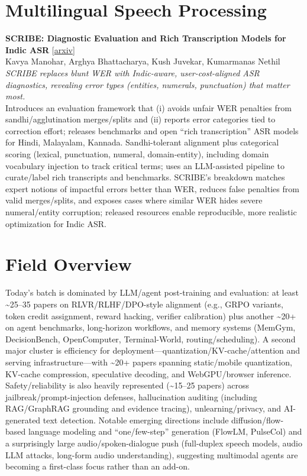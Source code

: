 \documentclass[12pt,letterpaper]{article}
\begin{document}
\medskip


\section*{Multilingual Speech Processing}

{\small\textbf{SCRIBE: Diagnostic Evaluation and Rich Transcription Models for Indic ASR}} {\scriptsize[\href{https://arxiv.org/abs/2605.20712}{arxiv}]}\\
{\scriptsize Kavya Manohar, Arghya Bhattacharya, Kush Juvekar, Kumarmanas Nethil}\\

{\small\textit{SCRIBE replaces blunt WER with Indic-aware, user-cost-aligned ASR diagnostics, revealing error types (entities, numerals, punctuation) that matter most.}}\\[1pt]
{\footnotesize Introduces an evaluation framework that (i) avoids unfair WER penalties from sandhi/agglutination merges/splits and (ii) reports error categories tied to correction effort; releases benchmarks and open ``rich transcription'' ASR models for Hindi, Malayalam, Kannada. Sandhi-tolerant alignment plus categorical scoring (lexical, punctuation, numeral, domain-entity), including domain vocabulary injection to track critical terms; uses an LLM-assisted pipeline to curate/label rich transcripts and benchmarks. SCRIBE's breakdown matches expert notions of impactful errors better than WER, reduces false penalties from valid merges/splits, and exposes cases where similar WER hides severe numeral/entity corruption; released resources enable reproducible, more realistic optimization for Indic ASR.}

\medskip



\section*{Field Overview}
{\footnotesize Today's batch is dominated by LLM/agent post-training and evaluation: at least \textasciitilde{}25--35 papers on RLVR/RLHF/DPO-style alignment (e.g., GRPO variants, token credit assignment, reward hacking, verifier calibration) plus another \textasciitilde{}20+ on agent benchmarks, long-horizon workflows, and memory systems (MemGym, DecisionBench, OpenComputer, Terminal-World, routing/scheduling). A second major cluster is efficiency for deployment---quantization/KV-cache/attention and serving infrastructure---with \textasciitilde{}20+ papers spanning static/mobile quantization, KV-cache compression, speculative decoding, and WebGPU/browser inference. Safety/reliability is also heavily represented (\textasciitilde{}15--25 papers) across jailbreak/prompt-injection defenses, hallucination auditing (including RAG/GraphRAG grounding and evidence tracing), unlearning/privacy, and AI-generated text detection. Notable emerging directions include diffusion/flow-based language modeling and ``one/few-step'' generation (FlowLM, PulseCol) and a surprisingly large audio/spoken-dialogue push (full-duplex speech models, audio LLM attacks, long-form audio understanding), suggesting multimodal agents are becoming a first-class focus rather than an add-on.}
\end{document}
